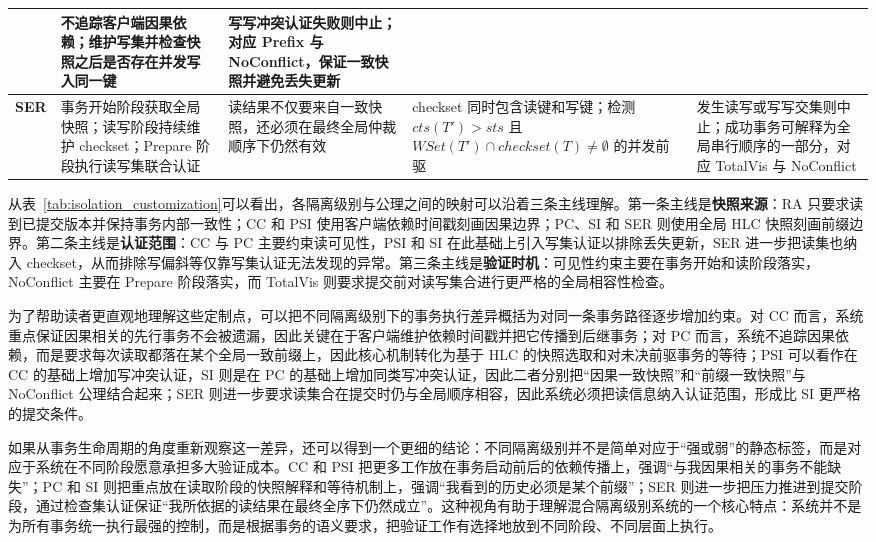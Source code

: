 \begin{table}[htbp]
\begin{tabularx}{\textwidth}{|>{\centering\arraybackslash}p{1.15cm}|>{\raggedright\arraybackslash}p{2.05cm}|>{\raggedright\arraybackslash}p{2.55cm}|>{\raggedright\arraybackslash}p{2.65cm}|>{\raggedright\arraybackslash}X|}
                  & 不追踪客户端因果依赖；维护写集并检查快照之后是否存在并发写入同一键
                  & 写写冲突认证失败则中止；对应 Prefix 与 NoConflict，保证一致快照并避免丢失更新
    \\
    \hline
    \textbf{SER}
                  & 事务开始阶段获取全局快照；读写阶段持续维护 checkset；Prepare 阶段执行读写集联合认证
                  & 读结果不仅要来自一致快照，还必须在最终全局仲裁顺序下仍然有效
                  & checkset 同时包含读键和写键；检测 $cts(T') > sts$ 且 $WSet(T') \cap checkset(T) \neq \emptyset$ 的并发前驱
                  & 发生读写或写写交集则中止；成功事务可解释为全局串行顺序的一部分，对应 TotalVis 与 NoConflict
    \\
    \hline
  \end{tabularx}
\end{table}

从表~\ref{tab:isolation_customization}可以看出，各隔离级别与公理之间的映射可以沿着三条主线理解。第一条主线是\textbf{快照来源}：RA 只要求读到已提交版本并保持事务内部一致性；CC 和 PSI 使用客户端依赖时间戳刻画因果边界；PC、SI 和 SER 则使用全局 HLC 快照刻画前缀边界。第二条主线是\textbf{认证范围}：CC 与 PC 主要约束读可见性，PSI 和 SI 在此基础上引入写集认证以排除丢失更新，SER 进一步把读集也纳入 checkset，从而排除写偏斜等仅靠写集认证无法发现的异常。第三条主线是\textbf{验证时机}：可见性约束主要在事务开始和读阶段落实，NoConflict 主要在 Prepare 阶段落实，而 TotalVis 则要求提交前对读写集合进行更严格的全局相容性检查。

为了帮助读者更直观地理解这些定制点，可以把不同隔离级别下的事务执行差异概括为对同一条事务路径逐步增加约束。对 CC 而言，系统重点保证因果相关的先行事务不会被遗漏，因此关键在于客户端维护依赖时间戳并把它传播到后继事务；对 PC 而言，系统不追踪因果依赖，而是要求每次读取都落在某个全局一致前缀上，因此核心机制转化为基于 HLC 的快照选取和对未决前驱事务的等待；PSI 可以看作在 CC 的基础上增加写冲突认证，SI 则是在 PC 的基础上增加同类写冲突认证，因此二者分别把“因果一致快照”和“前缀一致快照”与 NoConflict 公理结合起来；SER 则进一步要求读集合在提交时仍与全局顺序相容，因此系统必须把读信息纳入认证范围，形成比 SI 更严格的提交条件。

如果从事务生命周期的角度重新观察这一差异，还可以得到一个更细的结论：不同隔离级别并不是简单对应于“强或弱”的静态标签，而是对应于系统在不同阶段愿意承担多大验证成本。CC 和 PSI 把更多工作放在事务启动前后的依赖传播上，强调“与我因果相关的事务不能缺失”；PC 和 SI 则把重点放在读取阶段的快照解释和等待机制上，强调“我看到的历史必须是某个前缀”；SER 则进一步把压力推进到提交阶段，通过检查集认证保证“我所依据的读结果在最终全序下仍然成立”。这种视角有助于理解混合隔离级别系统的一个核心特点：系统并不是为所有事务统一执行最强的控制，而是根据事务的语义要求，把验证工作有选择地放到不同阶段、不同层面上执行。

